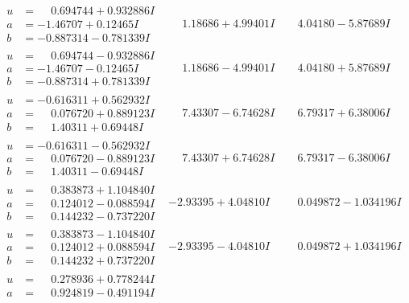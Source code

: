 \documentclass[1p]{elsarticle_modified}
\theoremstyle{definition}
\begin{document}
$$\begin{array}{c|c|c}
\begin{aligned}
u &= \phantom{-}0.694744 + 0.932886 I \\
a &= -1.46707 + 0.12465 I \\
b &= -0.887314 - 0.781339 I\end{aligned}
 & \phantom{-}1.18686 + 4.99401 I & \phantom{-}4.04180 - 5.87689 I \\ \hline\begin{aligned}
u &= \phantom{-}0.694744 - 0.932886 I \\
a &= -1.46707 - 0.12465 I \\
b &= -0.887314 + 0.781339 I\end{aligned}
 & \phantom{-}1.18686 - 4.99401 I & \phantom{-}4.04180 + 5.87689 I \\ \hline\begin{aligned}
u &= -0.616311 + 0.562932 I \\
a &= \phantom{-}0.076720 + 0.889123 I \\
b &= \phantom{-}1.40311 + 0.69448 I\end{aligned}
 & \phantom{-}7.43307 - 6.74628 I & \phantom{-}6.79317 + 6.38006 I \\ \hline\begin{aligned}
u &= -0.616311 - 0.562932 I \\
a &= \phantom{-}0.076720 - 0.889123 I \\
b &= \phantom{-}1.40311 - 0.69448 I\end{aligned}
 & \phantom{-}7.43307 + 6.74628 I & \phantom{-}6.79317 - 6.38006 I \\ \hline\begin{aligned}
u &= \phantom{-}0.383873 + 1.104840 I \\
a &= \phantom{-}0.124012 - 0.088594 I \\
b &= \phantom{-}0.144232 - 0.737220 I\end{aligned}
 & -2.93395 + 4.04810 I & \phantom{-}0.049872 - 1.034196 I \\ \hline\begin{aligned}
u &= \phantom{-}0.383873 - 1.104840 I \\
a &= \phantom{-}0.124012 + 0.088594 I \\
b &= \phantom{-}0.144232 + 0.737220 I\end{aligned}
 & -2.93395 - 4.04810 I & \phantom{-}0.049872 + 1.034196 I \\ \hline\begin{aligned}
u &= \phantom{-}0.278936 + 0.778244 I \\
a &= \phantom{-}0.924819 - 0.491194 I \\

\end{aligned}
\end{array}$$
\end{document}
